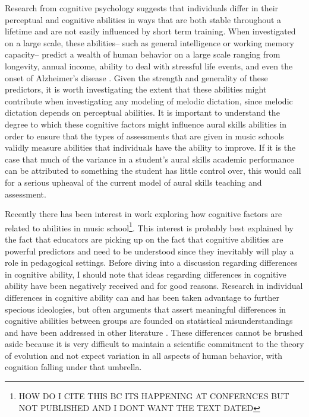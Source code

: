 \documentclass[12pt,]{book}
\let\rmarkdownfootnote\footnote%
\def\footnote{\protect\rmarkdownfootnote}
\begin{document}
Research from cognitive psychology suggests that individuals differ in their perceptual and cognitive abilities in ways that are both stable throughout a lifetime and are not easily influenced by short term training.
When investigated on a large scale, these abilities-- such as general intelligence or working memory capacity-- predict a wealth of human behavior on a large scale ranging from longevity, annual income, ability to deal with stressful life events, and even the onset of Alzheimer's disease \citep{ritchieIntelligenceAllThat2015, unsworthAutomatedVersionOperation2005}.
Given the strength and generality of these predictors, it is worth investigating the extent that these abilities might contribute when investigating any modeling of melodic dictation, since melodic dictation depends on perceptual abilities.
It is important to understand the degree to which these cognitive factors might influence aural skills abilities in order to ensure that the types of assessments that are given in music schools validly measure abilities that individuals have the ability to improve.
If it is the case that much of the variance in a student's aural skills academic performance can be attributed to something the student has little control over, this would call for a serious upheaval of the current model of aural skills teaching and assessment.

Recently there has been interest in work exploring how cognitive factors are related to abilities in music school\footnote{HOW DO I CITE THIS BC ITS HAPPENING AT CONFERNCES BUT NOT PUBLISHED AND I DONT WANT THE TEXT DATED}.
This interest is probably best explained by the fact that educators are picking up on the fact that cognitive abilities are powerful predictors and need to be understood since they inevitably will play a role in pedagogical settings.
Before diving into a discussion regarding differences in cognitive ability, I should note that ideas regarding differences in cognitive ability have been negatively received and for good reasons.
Research in individual differences in cognitive ability can and has been taken advantage to further specious ideologies, but often arguments that assert meaningful differences in cognitive abilities between groups are founded on statistical misunderstandings and have been addressed in other literature \citep{gouldMismeasureMan1996}.
These differences cannot be brushed aside because it is very difficult to maintain a scientific commitment to the theory of evolution \citep{darwinOriginSpecies1859} and not expect variation in all aspects of human behavior, with cognition falling under that umbrella.
\end{document}
